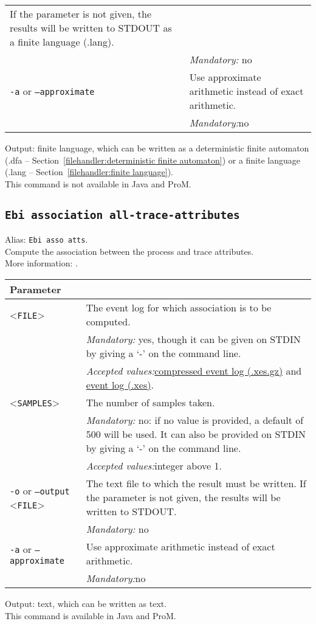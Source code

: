 {\begin{tabularx}{\linewidth}{lX}
If the parameter is not given, the results will be written to STDOUT as a finite language (.lang).\\
&\textit{Mandatory:} \quad no\\
\texttt{-a} or \texttt{--approximate} & Use approximate arithmetic instead of exact arithmetic.\\
&\textit{Mandatory:}\quad no\\
\bottomrule
\end{tabularx}
\noindent Output: finite language, which can be written as a deterministic finite automaton (.dfa -- Section~\ref{filehandler:deterministic finite automaton}) or a finite language (.lang -- Section~\ref{filehandler:finite language}).
\\This command is not available in Java and ProM.
\subsection{\texttt{Ebi association all-trace-attributes}}
\label{command:Ebi association all-trace-attributes}
Alias: \texttt{Ebi asso atts}.\\
Compute the association between the process and trace attributes.\\
More information: \cite{DBLP:journals/tkde/LeemansMPH23}.\\
\begin{tabularx}{\linewidth}{lX}
\toprule
Parameter \\\midrule
<\texttt{FILE}>&The event log for which association is to be computed.\\
&\textit{Mandatory:} \quad yes, though it can be given on STDIN by giving a `-' on the command line.\\
&\textit{Accepted values:}\quad \hyperref[filehandler:compressed event log]{compressed event log (.xes.gz)} and \hyperref[filehandler:event log]{event log (.xes)}.\\
<\texttt{SAMPLES}>&The number of samples taken.\\
&\textit{Mandatory:} \quad no: if no value is provided, a default of 500 will be used. It can also be provided on STDIN by giving a `-' on the command line.\\
&\textit{Accepted values:}\quad integer above 1.\\
\texttt{-o} or \texttt{--output} <\texttt{FILE}> &
The text file to which the result must be written. If the parameter is not given, the results will be written to STDOUT.\\
&\textit{Mandatory:} \quad no\\
\texttt{-a} or \texttt{--approximate} & Use approximate arithmetic instead of exact arithmetic.\\
&\textit{Mandatory:}\quad no\\
\bottomrule
\end{tabularx}
\noindent Output: text, which can be written as  text.
\\This command is available in Java and ProM.
}
